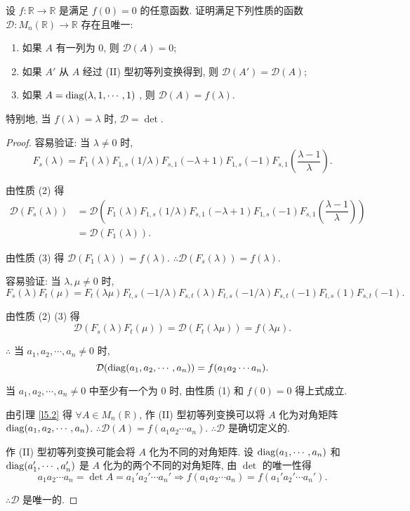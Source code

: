 \documentclass{ctexart}
\begin{document}
\begin{exercise}\label{ex4.1}
    设 $f:\mathbb{R}\to\mathbb{R}$ 是满足 $f(0)=0$ 的任意函数. 证明满足下列性质的函数 $\mathcal{D}:M_n(\mathbb{R})\to\mathbb{R}$ 存在且唯一:
    \begin{enumerate}
        \item 如果 $A$ 有一列为 $0$, 则 $\mathcal{D}(A)=0$;
        \item 如果 $A'$ 从 $A$ 经过 (II) 型初等列变换得到, 则 $\mathcal{D}(A')=\mathcal{D}(A)$;
        \item 如果 $A=\operatorname{diag}(\lambda,1,\cdots,1)$ , 则 $\mathcal{D}(A)=f(\lambda)$.
    \end{enumerate}

    特别地, 当 $f(\lambda)=\lambda$ 时, $\mathcal{D}=\det$.
\end{exercise}
\begin{proof}
    容易验证: 当 $\lambda\neq0$ 时,
    \[F_s(\lambda)=F_1(\lambda)F_{1,s}(1/\lambda)F_{s,1}(-\lambda+1)F_{1,s}(-1)F_{s,1}\left(\dfrac{\lambda-1}{\lambda}\right).\]

    由性质 (2) 得
    \begin{align*}
        \mathcal{D}(F_s(\lambda)) & =\mathcal{D}\left(F_1(\lambda)F_{1,s}(1/\lambda)F_{s,1}(-\lambda+1)F_{1,s}(-1)F_{s,1}\left(\dfrac{\lambda-1}{\lambda}\right)\right) \\
        & =\mathcal{D}(F_1(\lambda)).
    \end{align*}

    由性质 (3) 得 $\mathcal{D}(F_1(\lambda))=f(\lambda)$. $\therefore\mathcal{D}(F_s(\lambda))=f(\lambda)$.

    容易验证: 当 $\lambda,\mu\neq0$ 时,
    \[F_s(\lambda)F_t(\mu)=F_t(\lambda\mu)F_{t,s}(-1/\lambda)F_{s,t}(\lambda)F_{t,s}(-1/\lambda)F_{s,t}(-1)F_{t,s}(1)F_{s,t}(-1).\]

    由性质 (2) (3) 得
    \[\mathcal{D}(F_s(\lambda)F_t(\mu))=\mathcal{D}(F_t(\lambda\mu))=f(\lambda\mu).\]
    
    $\therefore$ 当 $a_1,a_2,\cdots,a_n\neq0$ 时,
    \[\mathcal{D}(\operatorname{diag}(a_1,a_2,\cdots,a_n))=f(a_1a_2\cdots a_n).\]

    当 $a_1,a_2,\cdots,a_n\neq0$ 中至少有一个为 $0$ 时, 由性质 (1) 和 $f(0)=0$ 得上式成立.

    由引理 \ref{l5.2} 得 $\forall A\in M_n(\mathbb{R})$, 作 (II) 型初等列变换可以将 $A$ 化为对角矩阵 $\operatorname{diag}(a_1,a_2,\cdots,a_n)$. $\therefore\mathcal{D}(A)=f(a_1a_2\cdots a_n)$. $\therefore\mathcal{D}$ 是确切定义的.

    作 (II) 型初等列变换可能会将 $A$ 化为不同的对角矩阵. 设 $\operatorname{diag}(a_1,\cdots,a_n)$ 和 $\operatorname{diag}(a_1',\cdots,a_n')$ 是 $A$ 化为的两个不同的对角矩阵, 由 $\det$ 的唯一性得
    \[a_1a_2\cdots a_n=\det A=a_1'a_2'\cdots a_n'\Rightarrow f(a_1a_2\cdots a_n)=f(a_1'a_2'\cdots a_n').\]

    $\therefore\mathcal{D}$ 是唯一的.
\end{proof}
\end{document}
